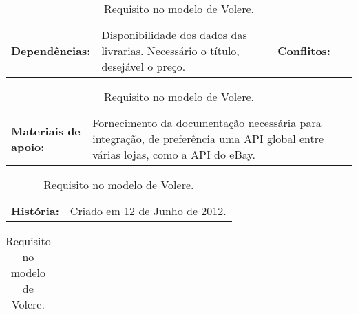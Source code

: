 \begin{table}[h]
    \vspace{5pt}
    \begin{tabularx}{\textwidth}{p{}p{}
                                 p{}p{}}
        \textbf{Dependências:} & Disponibilidade dos dados das 
        livrarias.  Necessário o título, desejável o preço.
        & \textbf{Conflitos:} & -- \\
    \end{tabularx}
    
    \vspace{5pt}
    \begin{tabularx}{\textwidth}{p{} p{}}
        \textbf{Materiais de apoio:} &
       Fornecimento da documentação necessária para integração, 
       de preferência uma API global entre várias lojas, como a
       API do eBay.
    \end{tabularx}
    
    \vspace{5pt}
    \begin{tabularx}{\textwidth}{p{} p{}}
        \textbf{História:} &
        Criado em 12 de Junho de 2012. \\
    \end{tabularx}
    
    \begin{tabularx}{\textwidth}{c}
        \bottomrule
    \end{tabularx}
    
    \caption{ \label{Volere4} Requisito no modelo de Volere. }
\end{table}
